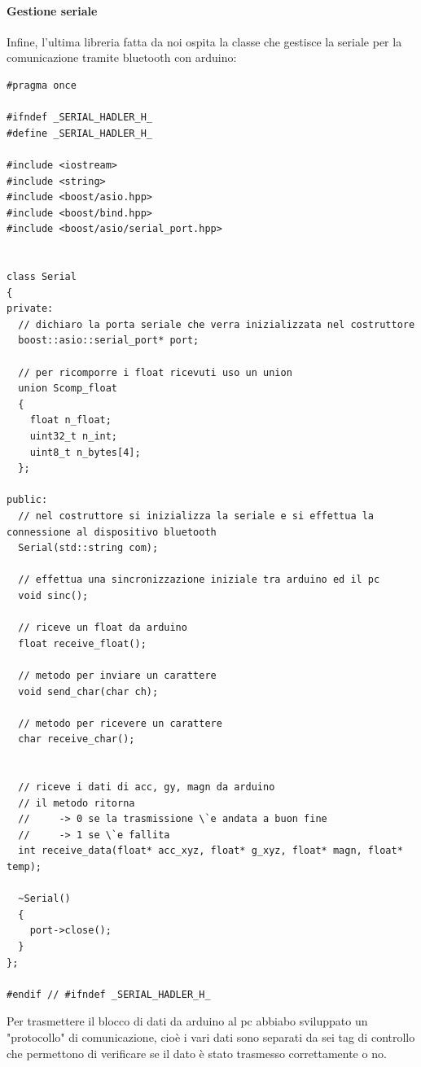 \documentclass[10pt,a4paper]{article}
\begin{document}
\paragraph{Gestione seriale}
Infine, l'ultima libreria fatta da noi ospita la classe che gestisce la seriale per la comunicazione tramite bluetooth con arduino:
\begin{lstlisting}[style=mycpp, caption=librerie usate, captionpos=b]
#pragma once

#ifndef _SERIAL_HADLER_H_
#define _SERIAL_HADLER_H_

#include <iostream>
#include <string>
#include <boost/asio.hpp> 
#include <boost/bind.hpp>
#include <boost/asio/serial_port.hpp> 


class Serial
{
private:
  // dichiaro la porta seriale che verra inizializzata nel costruttore
  boost::asio::serial_port* port;

  // per ricomporre i float ricevuti uso un union
  union Scomp_float
  {
    float n_float;
    uint32_t n_int;
    uint8_t n_bytes[4];
  };

public:
  // nel costruttore si inizializza la seriale e si effettua la connessione al dispositivo bluetooth
  Serial(std::string com);
  
  // effettua una sincronizzazione iniziale tra arduino ed il pc
  void sinc();

  // riceve un float da arduino
  float receive_float();

  // metodo per inviare un carattere
  void send_char(char ch);

  // metodo per ricevere un carattere
  char receive_char();


  // riceve i dati di acc, gy, magn da arduino
  // il metodo ritorna 
  //     -> 0 se la trasmissione \`e andata a buon fine
  //     -> 1 se \`e fallita
  int receive_data(float* acc_xyz, float* g_xyz, float* magn, float* temp);

  ~Serial()
  {
    port->close();
  }
};

#endif // #ifndef _SERIAL_HADLER_H_
\end{lstlisting}
Per trasmettere il blocco di dati da arduino al pc abbiabo sviluppato un "protocollo" di comunicazione, cio\`e i vari dati sono separati da sei tag di controllo che permettono di verificare se il dato \`e stato trasmesso correttamente o no.
\end{document}
